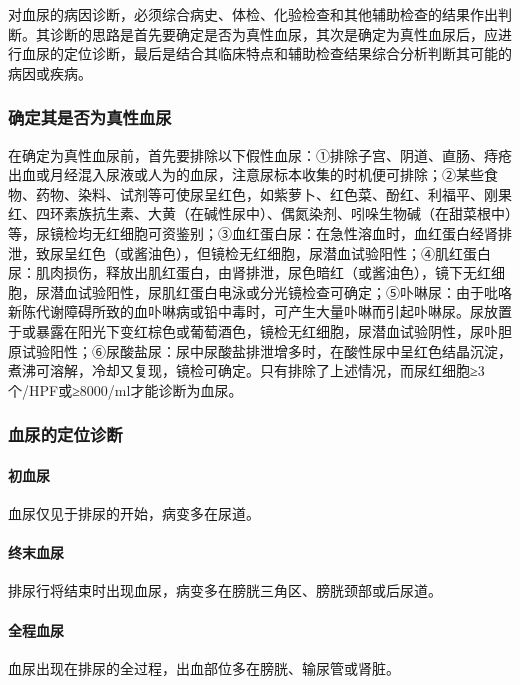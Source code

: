 对血尿的病因诊断，必须综合病史、体检、化验检查和其他辅助检查的结果作出判断。其诊断的思路是首先要确定是否为真性血尿，其次是确定为真性血尿后，应进行血尿的定位诊断，最后是结合其临床特点和辅助检查结果综合分析判断其可能的病因或疾病。

\subsubsection{确定其是否为真性血尿}

在确定为真性血尿前，首先要排除以下假性血尿：①排除子宫、阴道、直肠、痔疮出血或月经混入尿液或人为的血尿，注意尿标本收集的时机便可排除；②某些食物、药物、染料、试剂等可使尿呈红色，如紫萝卜、红色菜、酚红、利福平、刚果红、四环素族抗生素、大黄（在碱性尿中）、偶氮染剂、吲哚生物碱（在甜菜根中）等，尿镜检均无红细胞可资鉴别；③血红蛋白尿：在急性溶血时，血红蛋白经肾排泄，致尿呈红色（或酱油色），但镜检无红细胞，尿潜血试验阳性；④肌红蛋白尿：肌肉损伤，释放出肌红蛋白，由肾排泄，尿色暗红（或酱油色），镜下无红细胞，尿潜血试验阳性，尿肌红蛋白电泳或分光镜检查可确定；⑤卟啉尿：由于吡咯新陈代谢障碍所致的血卟啉病或铅中毒时，可产生大量卟啉而引起卟啉尿。尿放置于或暴露在阳光下变红棕色或葡萄酒色，镜检无红细胞，尿潜血试验阴性，尿卟胆原试验阳性；⑥尿酸盐尿：尿中尿酸盐排泄增多时，在酸性尿中呈红色结晶沉淀，煮沸可溶解，冷却又复现，镜检可确定。只有排除了上述情况，而尿红细胞≥3个/HPF或≥8000/ml才能诊断为血尿。

\subsubsection{血尿的定位诊断}

\paragraph{初血尿}

血尿仅见于排尿的开始，病变多在尿道。

\paragraph{终末血尿}

排尿行将结束时出现血尿，病变多在膀胱三角区、膀胱颈部或后尿道。

\paragraph{全程血尿}

血尿出现在排尿的全过程，出血部位多在膀胱、输尿管或肾脏。

